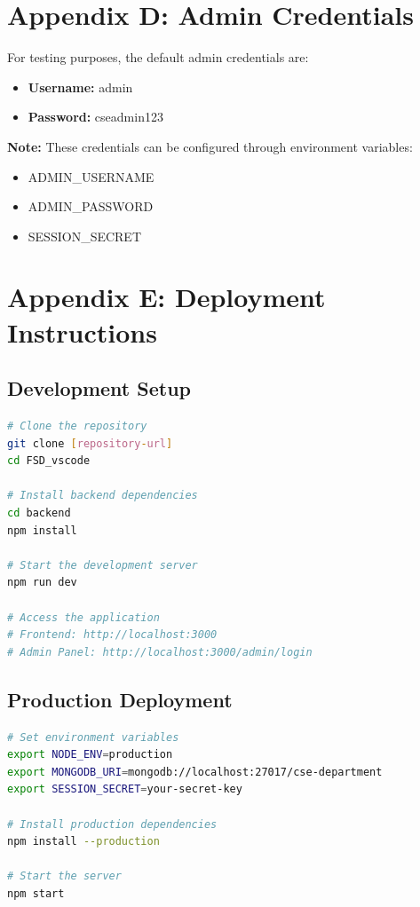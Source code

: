 \documentclass[12pt,a4paper]{report}
\begin{document}
\section{Appendix D: Admin Credentials}
For testing purposes, the default admin credentials are:
\begin{itemize}
    \item \textbf{Username:} admin
    \item \textbf{Password:} cseadmin123
\end{itemize}

\textbf{Note:} These credentials can be configured through environment variables:
\begin{itemize}
    \item ADMIN\_USERNAME
    \item ADMIN\_PASSWORD
    \item SESSION\_SECRET
\end{itemize}

\section{Appendix E: Deployment Instructions}
\subsection{Development Setup}
\begin{lstlisting}[language=bash, caption=Development Setup]
# Clone the repository
git clone [repository-url]
cd FSD_vscode

# Install backend dependencies
cd backend
npm install

# Start the development server
npm run dev

# Access the application
# Frontend: http://localhost:3000
# Admin Panel: http://localhost:3000/admin/login
\end{lstlisting}

\subsection{Production Deployment}
\begin{lstlisting}[language=bash, caption=Production Setup]
# Set environment variables
export NODE_ENV=production
export MONGODB_URI=mongodb://localhost:27017/cse-department
export SESSION_SECRET=your-secret-key

# Install production dependencies
npm install --production

# Start the server
npm start
\end{lstlisting}
\end{document}
